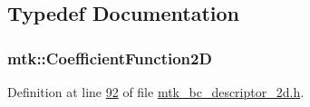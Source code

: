 \subsection{Typedef Documentation}
\hypertarget{group__c07-mim__ops_gad9e1c0ace886b0029aefffa5f320e852}{
\subsubsection[{Coefficient\+Function2\+D}]{\setlength{\rightskip}{0pt plus 5cm}mtk\+::\+Coefficient\+Function2\+D}}\label{group__c07-mim__ops_gad9e1c0ace886b0029aefffa5f320e852}


Definition at line \hyperlink{mtk__bc__descriptor__2d_8h_source_l00092}{92} of file \hyperlink{mtk__bc__descriptor__2d_8h_source}{mtk\+\_\+bc\+\_\+descriptor\+\_\+2d.\+h}.

